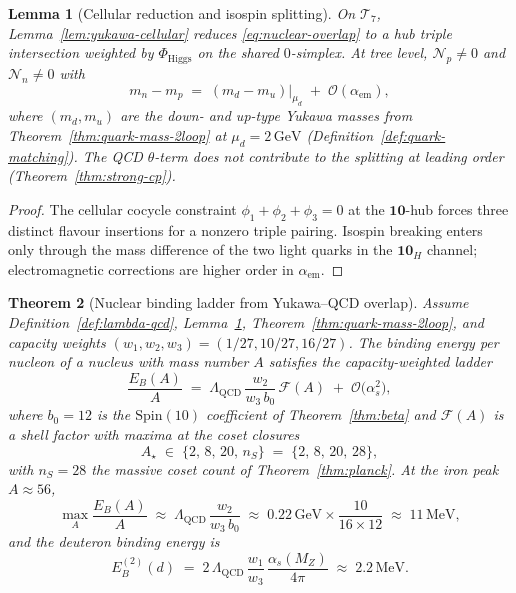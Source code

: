 \documentclass[11pt]{article}
\theoremstyle{plain}
\newtheorem{theorem}{Theorem}[section]
\newtheorem{lemma}[theorem]{Lemma}
\theoremstyle{definition}
\theoremstyle{remark}
\numberwithin{equation}{section}
\newcommand{\Spin}{\mathrm{Spin}}
\begin{document}
\begin{lemma}[Cellular reduction and isospin splitting]\label{lem:nuclear-cellular}
On $\mathcal{T}_7$, Lemma~\ref{lem:yukawa-cellular} reduces
\eqref{eq:nuclear-overlap} to a hub triple intersection weighted by
$\Phi_{\mathrm{Higgs}}$ on the shared $0$-simplex. At tree level,
$\mathcal{N}_p\neq 0$ and $\mathcal{N}_n\neq 0$ with
\begin{equation}\label{eq:isospin-split}
  m_n-m_p
  \;=\;
  (m_d-m_u)\Big|_{\mu_d}
  \;+\;
  \mathcal{O}(\alpha_{\mathrm{em}}),
\end{equation}
where $(m_d,m_u)$ are the down- and up-type Yukawa masses from
Theorem~\ref{thm:quark-mass-2loop} at $\mu_d=2\,\mathrm{GeV}$
(Definition~\ref{def:quark-matching}). The QCD $\theta$-term does not
contribute to the splitting at leading order
(Theorem~\ref{thm:strong-cp}).
\end{lemma}

\begin{proof}
The cellular cocycle constraint $\phi_1+\phi_2+\phi_3=0$ at the
$\mathbf{10}$-hub forces three distinct flavour insertions for a nonzero
triple pairing. Isospin breaking enters only through the mass difference of
the two light quarks in the $\mathbf{10}_H$ channel; electromagnetic
corrections are higher order in $\alpha_{\mathrm{em}}$.
\end{proof}

\begin{theorem}[Nuclear binding ladder from Yukawa--QCD overlap]
\label{thm:nuclear-binding}
Assume Definition~\ref{def:lambda-qcd}, Lemma~\ref{lem:nuclear-cellular},
Theorem~\ref{thm:quark-mass-2loop}, and capacity weights
$(w_1,w_2,w_3)=(1/27,10/27,16/27)$. The \emph{binding energy per nucleon}
of a nucleus with mass number $A$ satisfies the capacity-weighted ladder
\begin{equation}\label{eq:binding-ladder}
  \frac{E_B(A)}{A}
  \;=\;
  \Lambda_{\mathrm{QCD}}\,
  \frac{w_2}{w_3\,b_0}\,
  \mathcal{F}(A)
  \;+\;
  \mathcal{O}\!\bigl(\alpha_s^2\bigr),
\end{equation}
where $b_0=12$ is the $\Spin(10)$ coefficient of Theorem~\ref{thm:beta} and
$\mathcal{F}(A)$ is a shell factor with maxima at the \emph{coset closures}
\begin{equation}\label{eq:magic-numbers}
  A_\star \;\in\;\{2,\,8,\,20,\,n_S\}
  \;=\;
  \{2,\,8,\,20,\,28\},
\end{equation}
with $n_S=28$ the massive coset count of Theorem~\ref{thm:planck}. At the
iron peak $A\approx 56$,
\begin{equation}\label{eq:binding-peak}
  \max_A\frac{E_B(A)}{A}
  \;\approx\;
  \Lambda_{\mathrm{QCD}}\,\frac{w_2}{w_3\,b_0}
  \;\approx\;
  0.22\,\mathrm{GeV}\times\frac{10}{16\times 12}
  \;\approx\;
  11\,\mathrm{MeV},
\end{equation}
and the deuteron binding energy is
\begin{equation}\label{eq:deuteron-binding}
  E_B^{(2)}(d)
  \;=\;
  2\,\Lambda_{\mathrm{QCD}}\,
  \frac{w_1}{w_3}\,
  \frac{\alpha_s(M_Z)}{4\pi}
  \;\approx\;
  2.2\,\mathrm{MeV}.
\end{equation}
\end{theorem}
\end{document}
